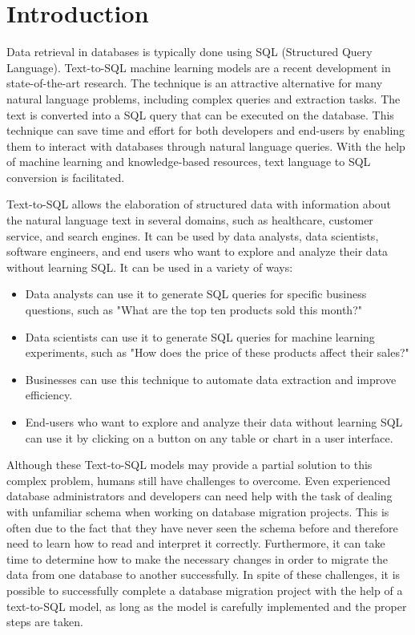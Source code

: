 \section{Introduction}

Data retrieval in databases is typically done using SQL (Structured Query Language). Text-to-SQL machine learning models are a recent development in state-of-the-art research. The technique is an attractive alternative for many natural language problems, including complex queries and extraction tasks. The text is converted into a SQL query that can be executed on the database. This technique can save time and effort for both developers and end-users by enabling them to interact with databases through natural language queries. With the help of machine learning and knowledge-based resources, text language to SQL conversion is facilitated.

Text-to-SQL allows the elaboration of structured data with information about the natural language text in several domains, such as healthcare, customer service, and search engines. It can be used by data analysts, data scientists, software engineers, and end users who want to explore and analyze their data without learning SQL. It can be used in a variety of ways:

\begin{itemize}
      \item Data analysts can use it to generate SQL queries for specific business questions, such as "What are the top ten products sold this month?"
      \item Data scientists can use it to generate SQL queries for machine learning experiments, such as "How does the price of these products affect their sales?"
      \item Businesses can use this technique to automate data extraction and improve efficiency.
      \item End-users who want to explore and analyze their data without learning SQL can use it by clicking on a button on any table or chart in a user interface.
\end{itemize}

Although these Text-to-SQL models may provide a partial solution to this complex problem, humans still have challenges to overcome. Even experienced database administrators and developers can need help with the task of dealing with unfamiliar schema when working on database migration projects. This is often due to the fact that they have never seen the schema before and therefore need to learn how to read and interpret it correctly. Furthermore, it can take time to determine how to make the necessary changes in order to migrate the data from one database to another successfully. In spite of these challenges, it is possible to successfully complete a database migration project with the help of a text-to-SQL model, as long as the model is carefully implemented and the proper steps are taken.

